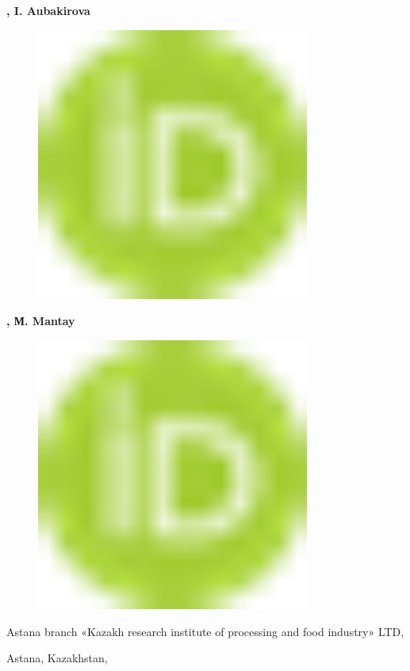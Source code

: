 {\bfseries ,
I.
Aubakirova}
\begin{figure}[H]
	\centering
	\includegraphics[width=0.8\textwidth]{media/pish2/image10}
	\caption*{}
\end{figure}
{\bfseries ,
М.
Mantay}
\begin{figure}[H]
	\centering
	\includegraphics[width=0.8\textwidth]{media/pish2/image10}
	\caption*{}
\end{figure}


Astana branch «Kazakh research institute of processing and food
industry» LTD,

Astana, Kazakhstan,

